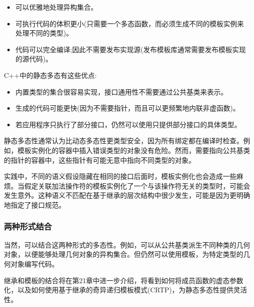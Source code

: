 \begin{itemize}
\item 
可以优雅地处理异构集合。

\item 
可执行代码的体积更小(只需要一个多态函数，而必须生成不同的模板实例来处理不同的类型)。

\item 
代码可以完全编译;因此不需要发布实现源(发布模板库通常需要发布模板实现的源代码)。
\end{itemize}

C++中的静态多态有这些优点:

\begin{itemize}
\item 
内置类型的集合很容易实现，接口通用性不需要通过公共基类来表示。

\item 
生成的代码可能更快(因为不需要指针，而且可以更频繁地内联非虚函数)。

\item 
若应用程序只执行了部分接口，仍然可以使用只提供部分接口的具体类型。
\end{itemize}

静态多态性通常认为比动态多态性更类型安全，因为所有绑定都在编译时检查。例如，模板实例化的容器中插入错误类型的对象没有危险。然而，需要指向公共基类的指针的容器中，这些指针有可能无意中指向不同类型的对象。

实践中，不同的语义假设隐藏在相同的接口后面时，模板实例化也会造成一些麻烦。当假定关联加法操作符的模板实例化了一个与该操作符无关的类型时，可能会发生意外。这种语义不匹配在基于继承的层次结构中很少发生，可能是因为更明确地指定了接口规范。

\subsubsection{两种形式结合}

当然，可以结合这两种形式的多态性。例如，可以从公共基类派生不同种类的几何对象，以便能够处理几何对象的异构集合。但仍然可以使用模板，为特定类型的几何对象编写代码。

继承和模板的结合将在第21章中进一步介绍，将看到如何将成员函数的虚态参数化，以及如何使用基于继承的奇异递归模板模式(CRTP)，为静态多态性提供灵活性。




























